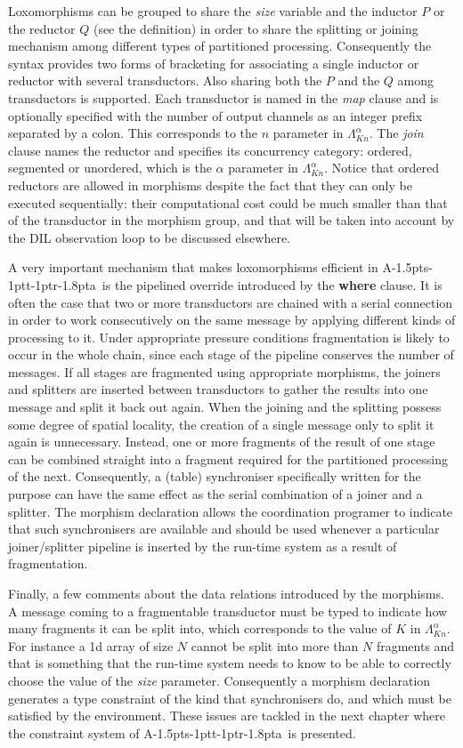 \documentclass[11pt]{report}
\def\ak{{\textsf{A\kern-1.5pts\kern-1ptt\kern-1ptr\kern-1.8pta}}\kern-2pt{\it K\kern-2ptahn}}
\begin{document}
Loxomorphisms can be grouped to share the {\em size} variable and the inductor $P$ or  the reductor $Q$ (see the definition) in order to share the splitting or joining mechanism among different types of partitioned processing. Consequently the syntax provides two forms of bracketing for associating a single inductor or 
reductor with several transductors. Also sharing both the $P$ and the $Q$ among transductors is supported. Each transductor is named in the {\it map} clause
and is optionally specified with the number of output channels as an integer prefix separated by a colon. This corresponds to the $n$ parameter 
in $\Lambda_{Kn}^\alpha$. 
The {\em join} clause names the reductor and specifies
its concurrency category: ordered, segmented or unordered, which is the $\alpha$ parameter in $\Lambda_{Kn}^\alpha$. 
Notice that ordered reductors are allowed in morphisms despite the fact that they can only be executed
sequentially: their computational cost could be much smaller than that of the transductor in the morphism group, and that will be taken into account by the DIL
observation loop to be discussed elsewhere. 

A very important mechanism that makes loxomorphisms efficient in \ak\ is the pipelined override introduced by the {\bf where} clause. It is often the case
that two or more transductors are chained with a serial connection in order to work consecutively on the same message by applying different kinds of processing to it.
Under appropriate pressure conditions fragmentation is likely to occur in the whole chain, since each stage of the pipeline conserves the number of messages. 
If all stages are fragmented using appropriate morphisms, the joiners and splitters are inserted between transductors to gather the results into one message and split it back out again. When the joining and the splitting possess some degree of spatial locality, the creation of a single message only to split it again is unnecessary. Instead, one or more fragments of the result of one stage can be combined straight into a fragment required for the partitioned processing of the next. Consequently, a  (table) synchroniser specifically written for the purpose can have the same effect as the serial combination of a joiner and a splitter. The morphism declaration allows the
coordination programer to indicate that such synchronisers are available and should be used whenever a particular joiner/splitter pipeline is inserted by the
run-time system as a result of fragmentation.         

Finally, a few comments about the data relations introduced by the morphisms. A message coming to a fragmentable transductor must be typed to indicate 
how many fragments it can be split into, which corresponds to the value of $K$ in $\Lambda_{Kn}^\alpha$. 
For instance a 1d array of size $N$ cannot be split into more than $N$ fragments and that is something that the run-time
system needs to know to be able to correctly choose the value of the {\em size} parameter. Consequently a morphism declaration generates a type constraint
of the kind that synchronisers do, and which must be satisfied by the environment. These issues are tackled in the next chapter where the constraint system 
of \ak\ is presented.
\end{document}
